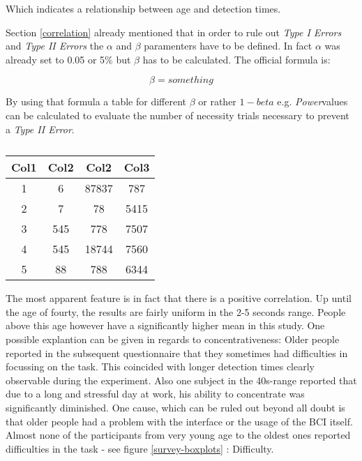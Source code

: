             Which indicates a  relationship between age and detection times. 

            \medskip

            Section \ref*{correlation} already mentioned that in order to rule out \textit{Type I Errors} and \textit{Type II Errors} the $\alpha$ and $\beta$ paramenters have to be defined. In fact $\alpha$ was already set to 0.05 or 5\% but $\beta$ has to be calculated.
            The official formula is:

            \begin{equation}\label{beta-value}
                \beta = something
            \end{equation}


            \medskip

            By using that formula a table for different $\beta$ or rather $1-beta$ e.g. \textit{Power}values can be calculated to evaluate the number of necessity trials necessary to prevent a \textit{Type II Error}.

            \begin{table}[h!]
                \centering
                \begin{tabular}{||c c c c||} 
                 \hline
                 Col1 & Col2 & Col2 & Col3 \\ [0.5ex] 
                 \hline\hline
                 1 & 6 & 87837 & 787 \\ 
                 2 & 7 & 78 & 5415 \\
                 3 & 545 & 778 & 7507 \\
                 4 & 545 & 18744 & 7560 \\
                 5 & 88 & 788 & 6344 \\ [1ex] 
                 \hline
                \end{tabular}
                \caption{}
                \label{beta}
            \end{table}


            The most apparent feature is in fact that there is a positive correlation. Up until the age of fourty, the results are fairly uniform in the 2-5 seconds range. People above this age however have a significantly higher mean in this study. One possible explantion can be given in regards to concentrativeness: Older people reported in the subsequent questionnaire that they sometimes had difficulties in focussing on the task. This coincided with longer detection times clearly observable during the experiment. Also one subject in the 40s-range reported that due to a long and stressful day at work, his ability to concentrate was significantly diminished. One cause, which can be ruled out beyond all doubt is that older people had a problem with the interface or the usage of the BCI itself. Almost none of the participants from very young age to the oldest ones reported difficulties in the task - see figure \ref*{survey-boxplots} : Difficulty.

